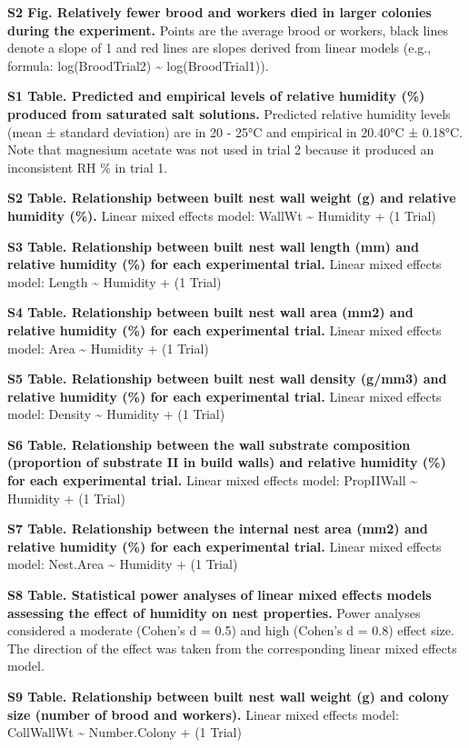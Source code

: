 \documentclass[3p]{elsarticle} %
\begin{document}
\textbf{S2 Fig. Relatively fewer brood and workers died in larger
colonies during the experiment.} Points are the average brood or
workers, black lines denote a slope of 1 and red lines are slopes
derived from linear models (e.g., formula: log(BroodTrial2)
\textasciitilde{} log(BroodTrial1)).

\textbf{S1 Table. Predicted and empirical levels of relative humidity
(\%) produced from saturated salt solutions.} Predicted relative
humidity levels (mean ± standard deviation) are in 20 - 25°C and
empirical in 20.40°C ± 0.18°C. Note that magnesium acetate was not used
in trial 2 because it produced an inconsistent RH \% in trial 1.

\textbf{S2 Table. Relationship between built nest wall weight (g) and
relative humidity (\%).} Linear mixed effects model: WallWt
\textasciitilde{} Humidity + (1 \textbar{} Trial)

\textbf{S3 Table. Relationship between built nest wall length (mm) and
relative humidity (\%) for each experimental trial.} Linear mixed
effects model: Length \textasciitilde{} Humidity + (1 \textbar{} Trial)

\textbf{S4 Table. Relationship between built nest wall area (mm2) and
relative humidity (\%) for each experimental trial.} Linear mixed
effects model: Area \textasciitilde{} Humidity + (1 \textbar{} Trial)

\textbf{S5 Table. Relationship between built nest wall density (g/mm3)
and relative humidity (\%) for each experimental trial.} Linear mixed
effects model: Density \textasciitilde{} Humidity + (1 \textbar{} Trial)

\textbf{S6 Table. Relationship between the wall substrate composition
(proportion of substrate II in build walls) and relative humidity (\%)
for each experimental trial.} Linear mixed effects model: PropIIWall
\textasciitilde{} Humidity + (1 \textbar{} Trial)

\textbf{S7 Table. Relationship between the internal nest area (mm2) and
relative humidity (\%) for each experimental trial.} Linear mixed
effects model: Nest.Area \textasciitilde{} Humidity + (1 \textbar{}
Trial)

\textbf{S8 Table. Statistical power analyses of linear mixed effects
models assessing the effect of humidity on nest properties.} Power
analyses considered a moderate (Cohen's d = 0.5) and high (Cohen's d =
0.8) effect size. The direction of the effect was taken from the
corresponding linear mixed effects model.

\textbf{S9 Table. Relationship between built nest wall weight (g) and
colony size (number of brood and workers).} Linear mixed effects model:
CollWallWt \textasciitilde{} Number.Colony + (1 \textbar{} Trial)
\end{document}

